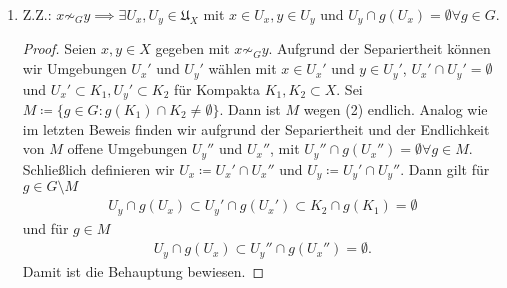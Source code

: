 \documentclass{article}
\begin{document}
\begin{enumerate}[(1)]
\begin{proof}
\begin{align*}
        &\implies g(U_x) = g\left(\bigcap_{g\in M} g^{-1}(U_g) \cap U_x' \cap U_0\right)\subset g(g^{-1}(U_g)) = U_g
      \end{align*}
      Außerdem gilt $U_x \subset U_x'$. Daher erhalten wir $g(U_x) \cap U_x \subset U_g \cap U_x'$.
      Wegen $\emptyset \neq g(U_x) \cap U_x$ folgt $\emptyset \neq U_g \cap U_x' \implies g = e$.
    \end{proof}
    \item Z.Z.: $x \not \sim_G y \implies \exists U_x, U_y \in \mathfrak{U}_X$ mit $x\in U_x, y\in U_y$ und $U_y \cap g(U_x) = \emptyset \forall g\in G$.
    \begin{proof}
      Seien $x, y \in X$ gegeben mit $x\not \sim_G y$. 
      Aufgrund der Separiertheit können wir Umgebungen $U_x'$ und $U_y'$ wählen mit $x \in U_x'$ und 
      $y\in U_y'$, $U_x' \cap U_y' = \emptyset$ und $U_x' \subset K_1, U_y' \subset K_2$ für Kompakta $K_1, K_2 \subset X$.
      Sei $M \coloneqq \{g \in G\colon g(K_1) \cap K_2 \neq \emptyset\}$. Dann ist $M$ wegen (2) endlich.
      Analog wie im letzten Beweis finden wir aufgrund der Separiertheit und der Endlichkeit von $M$ offene Umgebungen $U_y''$ und $U_x''$, 
      mit $U_y'' \cap g(U_x'') = \emptyset \forall g\in M$.
      Schließlich definieren wir $U_x \coloneqq U_x' \cap U_x''$ und $U_y \coloneqq U_y' \cap U_y''$.
      Dann gilt für $g \in G\setminus M$
      \begin{align*}
        U_y \cap g(U_x) \subset U_y' \cap g(U_x') \subset K_2 \cap g(K_1) = \emptyset
      \end{align*}
      und für $g\in M$
      \begin{align*}
        U_y \cap g(U_x) \subset U_y'' \cap g(U_x'') = \emptyset.
      \end{align*}
      Damit ist die Behauptung bewiesen.
    \end{proof}
  \end{enumerate}
\end{document}
